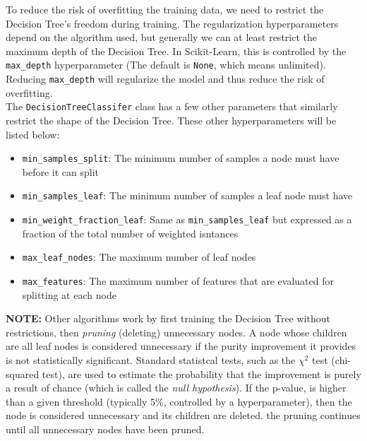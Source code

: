 \noindent
To reduce the risk of overfitting the training data, we need to restrict the Decision Tree's freedom during training. The regularization
hyperparameters depend on the algorithm used, but generally we can at least restrict the maximum depth of the Decision Tree. In Scikit-Learn,
this is controlled by the \texttt{max_depth} hyperparameter (The default is \texttt{None}, which means unlimited). 
Reducing \texttt{max_depth} will regularize the model and thus reduce the risk of overfitting. \\

\noindent
The \texttt{DecisionTreeClassifer} class has a few other parameters that similarly restrict the shape of the Decision Tree. These 
other hyperparameters will be listed below:

\begin{itemize}
    \item \texttt{min_samples_split}: The minimum number of samples a node must have before it can split
    \item \texttt{min_samples_leaf}: The minimum number of samples a leaf node must have
    \item \texttt{min_weight_fraction_leaf}: Same as \texttt{min_samples_leaf} but expressed as a fraction of the total
    number of weighted isntances
    \item \texttt{max_leaf_nodes}: The maximum number of leaf nodes
    \item \texttt{max_features}: The maximum number of features that are evaluated for splitting at each node
\end{itemize}

\noindent
\textbf{NOTE:} Other algorithms work by first training the Decision Tree without restrictions, then \textit{pruning} (deleting) unnecessary 
nodes. A node whose children are all leaf nodes is considered unnecessary if the purity improvement it provides is not statistically significant.
Standard statistcal tests, such as the $\chi^{2}$ test (chi-squared test), are used to estimate the probability that the improvement is purely
a result of chance (which is called the \textit{null hypothesis}). If the p-value, is higher than a given threshold (typically 5\%, controlled
by a hyperparameter), then the node is considered unnecessary and its children are deleted. the pruning continues until all unnecessary nodes
have been pruned.\\

